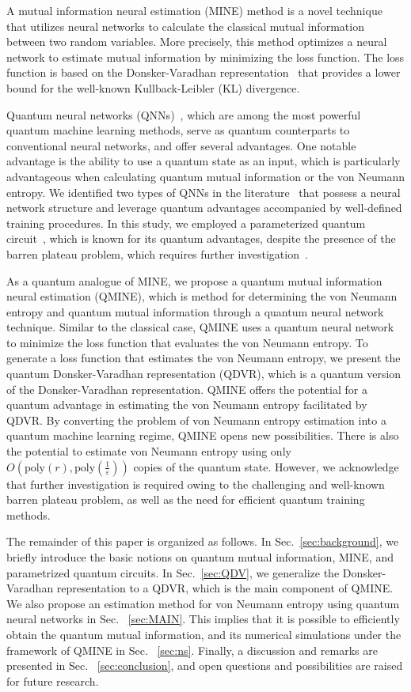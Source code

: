 \documentclass[aps,groupedaddress,superscriptaddress,amssymb,amsmath,amsbsy,amsfonts,twocolumn,pra]{revtex4}
\begin{document}
A mutual information neural estimation (MINE) method is a novel technique that utilizes neural networks to calculate the classical mutual information between two random variables. More precisely, this method optimizes a neural network to estimate mutual information by minimizing the loss function. The loss function is based on the Donsker-Varadhan representation~\cite{vN96} that provides a lower bound for the well-known Kullback-Leibler (KL) divergence.

Quantum neural networks (QNNs)~\cite{BBF+20, WDK+17}, which are among the most powerful quantum machine learning methods, serve as quantum counterparts to conventional neural networks, and offer several advantages. One notable advantage is the ability to use a quantum state as an input, which is particularly advantageous when calculating quantum mutual information or the von Neumann entropy. We identified two types of QNNs in the literature~\cite{BBF+20, BLSF19} that possess a neural network structure and leverage quantum advantages accompanied by well-defined training procedures. In this study, we employed a parameterized quantum circuit~\cite{BLSF19}, which is known for its quantum advantages, despite the presence of the barren plateau problem, which requires further investigation~\cite{MBS+18}.

As a quantum analogue of MINE, we propose a quantum mutual information neural estimation (QMINE), which is method for determining the von Neumann entropy and quantum mutual information through a quantum neural network technique. Similar to the classical case, QMINE uses a quantum neural network to minimize the loss function that evaluates the von Neumann entropy. To generate a loss function that estimates the von Neumann entropy, we present the quantum Donsker-Varadhan representation (QDVR), which is a quantum version of the Donsker-Varadhan representation. QMINE offers the potential for a quantum advantage in estimating the von Neumann entropy facilitated by QDVR. By converting the problem of von Neumann entropy estimation into a quantum machine learning regime, QMINE opens new possibilities. There is also the potential to estimate von Neumann entropy using only $O(\text{poly}(r), \text{poly}(\frac{1}{\varepsilon}))$ copies of the quantum state. However, we acknowledge that further investigation is required owing to the challenging and well-known barren plateau problem, as well as the need for efficient quantum training methods.

The remainder of this paper is organized as follows. In Sec.~\ref{sec:background}, we briefly introduce the basic notions on quantum mutual information, MINE, and parametrized quantum circuits. In Sec.~\ref{sec:QDV}, we generalize the Donsker-Varadhan representation to a QDVR, which is the main component of QMINE. We also propose an estimation method for von Neumann entropy using quantum neural networks in Sec. ~\ref{sec:MAIN}. This implies that it is possible to efficiently obtain the quantum mutual information, and its numerical simulations under the framework of QMINE in Sec. ~\ref{sec:ns}. Finally, a discussion and remarks are presented in Sec. ~\ref{sec:conclusion}, and open questions and possibilities are raised for future research.
\end{document}
